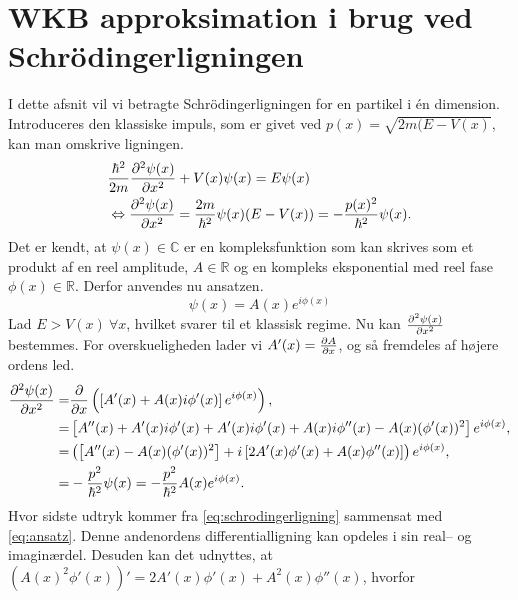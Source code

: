 \section{WKB approksimation i brug ved Schrödingerligningen}
I dette afsnit vil vi betragte Schrödingerligningen for en partikel i én dimension. Introduceres den klassiske impuls, som er givet ved $p(x) = \sqrt{2m(E-V(x)}$, kan man omskrive ligningen.
%
\begin{align}
    & \frac{\hbar^2}{2m} \pdiff[2]{\psi(x)}{x} + V(x)\psi(x) = E\psi(x) \\
    & \Leftrightarrow \pdiff[2]{\psi(x)}{x} = \frac{2m}{\hbar^2}\psi(x)(E - V(x))  = - \frac{p(x)^2}{\hbar^2}\psi(x).
    \label{eq:schrodingerligning}
\end{align}
%
Det er kendt, at $\psi(x) \in \mathbb{C}$ er en kompleksfunktion som kan skrives som et produkt af en reel amplitude, $A \in \mathbb{R}$ og en kompleks eksponential med reel fase $\phi(x)\in \mathbb{R}$. Derfor anvendes nu ansatzen.
\begin{equation}
    \psi(x) = A(x) e^{i \phi(x)}
    \label{eq:ansatz}
\end{equation}
Lad $E > V(x) \ \forall x$, hvilket svarer til et klassisk regime.
Nu kan $\pdiff[2]{\psi(x)}{x}$ bestemmes. For overskueligheden lader vi $A'(x) = \pdiff{A}{x}$, og så fremdeles af højere ordens led.
\begin{align}
    \pdiff[2]{\psi(x)}{x} = & \pdiff{}{x}\left( \left[ A'(x) + A(x)i\phi'(x) \right]e^{i\phi(x)} \right), \\
    = & \left[ A''(x) + A'(x)i\phi'(x) + A'(x)i\phi'(x) + A(x)i\phi''(x) - A(x)( \phi'(x))^2\right]e^{i\phi(x)}, \\
    = & \left(\left[ A''(x) - A(x)(\phi'(x))^2\right] + i \left[2A'(x)\phi'(x) + A(x)\phi''(x) \right]\right)e^{i\phi(x)},\\
    = & -\frac{p^2}{\hbar^2}\psi(x) = -\frac{p^2}{\hbar^2} A(x)e^{i\phi(x)}.
    \label{eq:regime}
\end{align}
Hvor sidste udtryk kommer fra \cref{eq:schrodingerligning} sammensat med \cref{eq:ansatz}.
Denne andenordens differentialligning kan opdeles i sin real-- og imaginærdel. Desuden kan det udnyttes, at $\left( A(x)^2\phi'(x) \right)' = 2A'(x)\phi'(x) + A^2(x)\phi''(x)$, hvorfor

